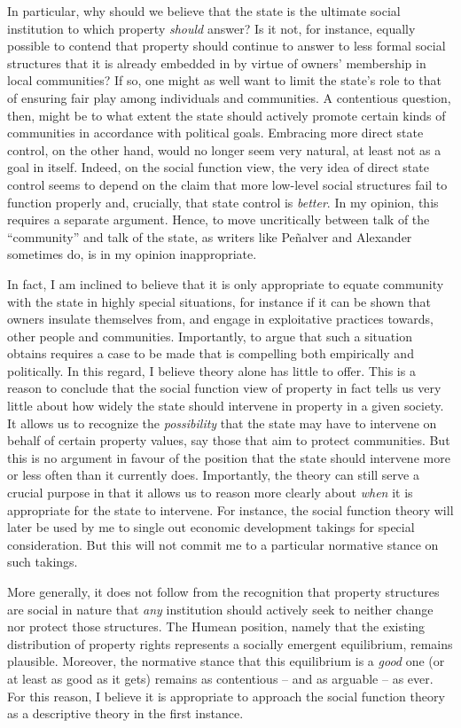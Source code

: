 In particular, why should we believe that the state is the ultimate social institution to which property {\it should} answer? Is it not, for instance, equally possible to contend that property should continue to answer to less formal social structures that it is already embedded in by virtue of owners' membership in local communities? If so, one might as well want to limit the state's role to that of ensuring fair play among individuals and communities. A contentious question, then, might be to what extent the state should actively promote certain kinds of communities in accordance with political goals. Embracing more direct state control, on the other hand, would no longer seem very natural, at least not as a goal in itself. Indeed, on the social function view, the very idea of direct state control seems to depend on the claim that more low-level social structures fail to function properly and, crucially, that state control is {\it better}. In my opinion, this requires a separate argument. Hence, to move uncritically between talk of the ``community'' and talk of the state, as writers like Pe\~{n}alver and Alexander sometimes do, is in my opinion inappropriate.

In fact, I am inclined to believe that it is only appropriate to equate community with the state in highly special situations, for instance if it can be shown that owners insulate themselves from, and engage in exploitative practices towards, other people and communities. Importantly, to argue that such a situation obtains requires a case to be made that is compelling both empirically and politically. In this regard, I believe theory alone has little to offer. This is a reason to conclude that the social function view of property in fact tells us very little about how widely the state should intervene in property in a given society. It allows us to recognize the {\it possibility} that the state may have to intervene on behalf of certain property values, say those that aim to protect communities. But this is no argument in favour of the position that the state should intervene more or less often than it currently does. Importantly, the theory can still serve a crucial purpose in that it allows us to reason more clearly about {\it when} it is appropriate for the state to intervene. For instance, the social function theory will later be used by me to single out economic development takings for special consideration. But this will not commit me to a particular normative stance on such takings.

More generally, it does not follow from the recognition that property structures are social in nature that {\it any} institution should actively seek to neither change nor protect those structures. The Humean position, namely that the existing distribution of property rights represents a socially emergent equilibrium, remains plausible. Moreover, the normative stance that this equilibrium is a {\it good} one (or at least as good as it gets) remains as contentious -- and as arguable -- as ever. For this reason, I believe it is appropriate to approach the social function theory as a descriptive theory in the first instance.

